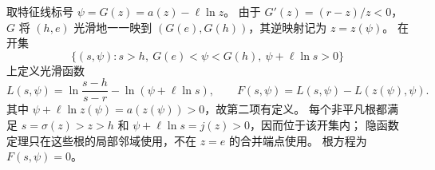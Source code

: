 取特征线标号 $\psi=G(z)=a(z)-\ell\ln z$。
由于 $G'(z)=(r-z)/z<0$，$G$ 将 $(h,e)$ 光滑地一一映到
$(G(e),G(h))$，其逆映射记为 $z=z(\psi)$。
在开集
\[
\{(s,\psi):s>h,\ G(e)<\psi<G(h),\ \psi+\ell\ln s>0\}
\]
上定义光滑函数
\[
L(s,\psi)=\ln\frac{s-h}{s-r}-\ln(\psi+\ell\ln s),\qquad
F(s,\psi)=L(s,\psi)-L(z(\psi),\psi).
\]
其中 $\psi+\ell\ln z(\psi)=a(z(\psi))>0$，故第二项有定义。
每个非平凡根都满足 $s=\sigma(z)>z>h$ 和
$\psi+\ell\ln s=j(z)>0$，因而位于该开集内；
隐函数定理只在这些根的局部邻域使用，不在 $z=e$ 的合并端点使用。
根方程为 $F(s,\psi)=0$。
